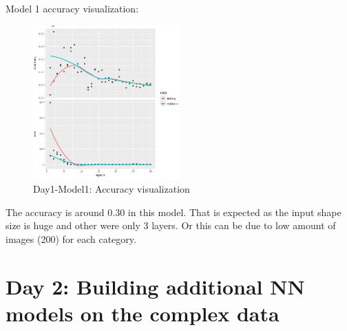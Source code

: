 \documentclass[letterpaper,11pt]{article}
\begin{document}
Model 1 accuracy visualization:
\begin{figure}[H]
    \centering
    \includegraphics[width=0.5\textwidth]{Results/D1_m1.jpg}
    \caption{Day1-Model1: Accuracy visualization}
    \label{fig:D1_m1}
\end{figure}

The accuracy is around 0.30 in this model. That is expected as the input shape size is huge and other were only 3 layers. Or this can be due to low amount of images (200) for each category. 

\section{Day 2: Building additional NN models on the complex data}
\end{document}
